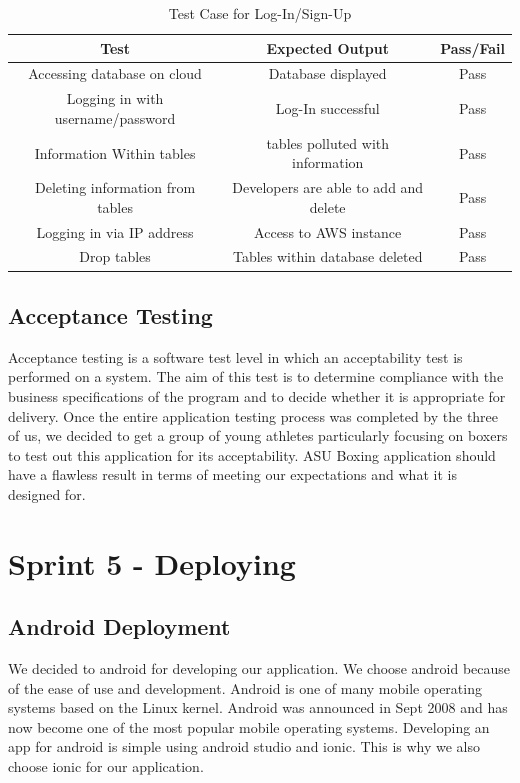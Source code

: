 \documentclass[a4paper,12pt]{report}
\begin{document}
\begin{table}[h]
    \centering
    \begin{tabular}{||c c c||} 
     \hline
     \textbf{Test} & \textbf{Expected Output} & \textbf{Pass/Fail} \\ [0.5ex] 
     \hline\hline
     Accessing database on cloud  & Database displayed & Pass \\ 
     \hline
     Logging in with username/password & Log-In successful & Pass \\  
     \hline
     Information Within tables & tables polluted with information & Pass \\
     \hline
     Deleting information from tables & Developers are able to add and delete  & Pass \\
     \hline
     Logging in via IP address & Access to AWS instance & Pass \\
     \hline
     Drop tables & Tables within database deleted & Pass \\
     \hline
    \end{tabular}
    \caption{Test Case for Log-In/Sign-Up}
    \label{tab:LogInTest}
\end{table}

\subsection{Acceptance Testing}
Acceptance testing is a software test level in which an acceptability test is performed on a system. The aim of this test is to determine compliance with the business specifications of the program and to decide whether it is appropriate for delivery. Once the entire application testing process was completed by the three of us, we decided to get a group of young athletes particularly focusing on boxers to test out this application for its acceptability. ASU Boxing application should have a flawless result in terms of meeting our expectations and what it is designed for.

\section{Sprint 5 - Deploying}
\subsection{Android Deployment}
We decided to android for developing our application. We choose android because of the ease of use and development. Android is one of many mobile operating systems based on the Linux kernel. Android was announced in Sept 2008 and has now become one of the most popular mobile operating systems. Developing an app for android is simple using android studio and ionic. This is why we also choose ionic for our application. 
\end{document}
